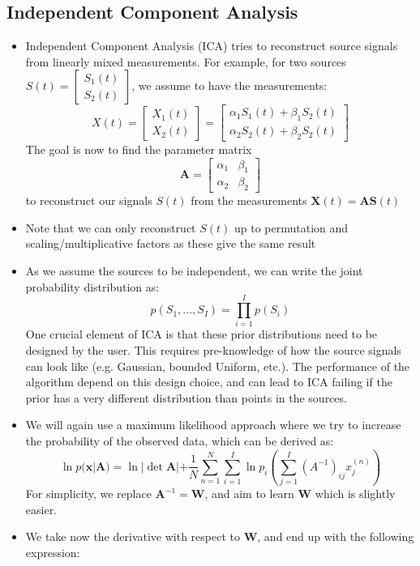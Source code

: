 \subsection{Independent Component Analysis}
\begin{itemize}
	\item Independent Component Analysis (ICA) tries to reconstruct source signals from linearly mixed measurements. For example, for two sources $S(t)=\begin{bmatrix}
	S_1(t)\\S_2(t)
	\end{bmatrix}$, we assume to have the measurements:
	$$X(t)=\begin{bmatrix}
	X_1(t)\\X_2(t)
	\end{bmatrix} = \begin{bmatrix}
	\alpha_1 S_1(t) + \beta_1 S_2(t)\\\alpha_2 S_2(t) + \beta_2 S_2(t)
	\end{bmatrix}$$
	The goal is now to find the parameter matrix
	$$\bm{A}=\begin{bmatrix}
	\alpha_1 & \beta_1\\ \alpha_2 & \beta_2
	\end{bmatrix}$$
	to reconstruct our signals $S(t)$ from the measurements $\bm{X}(t)=\bm{A}\bm{S}(t)$
	\item Note that we can only reconstruct $S(t)$ up to permutation and scaling/multiplicative factors as these give the same result
	\item As we assume the sources to be independent, we can write the joint probability distribution as:
	$$p(S_1,...,S_I)=\prod_{i=1}^{I}p(S_i)$$
	One crucial element of ICA is that these prior distributions need to be designed by the user. This requires pre-knowledge of how the source signals can look like (e.g. Gaussian, bounded Uniform, etc.). The performance of the algorithm depend on this design choice, and can lead to ICA failing if the prior has a very different distribution than points in the sources.
	\item We will again use a maximum likelihood  approach where we try to increase the probability of the observed data, which can be derived as:
	$$\ln p(\bm{x}|\bm{A})=\ln |\det \bm{A}| + \frac{1}{N}\sum_{n=1}^{N}\sum_{i=1}^{I}\ln p_i\left(\sum_{j=1}^{I} \left(A^{-1}\right)_{ij} x^{(n)}_j\right)$$
	For simplicity, we replace $\bm{A}^{-1}=\bm{W}$, and aim to learn $\bm{W}$ which is slightly easier.
	\item We take now the derivative with respect to $\bm{W}$, and end up with the following expression:

\end{itemize}
